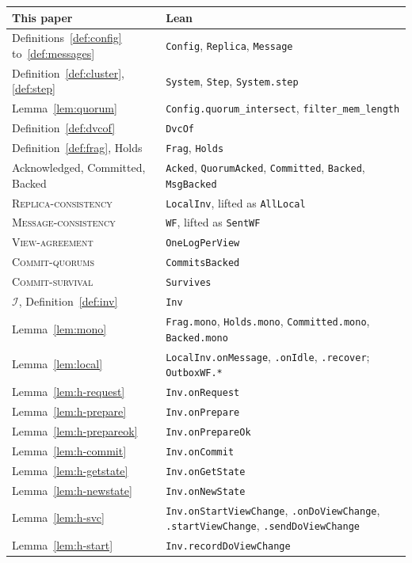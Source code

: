 \documentclass[11pt,a4paper]{article}
\theoremstyle{plain}
\theoremstyle{definition}
\theoremstyle{remark}
\newcommand{\Inv}{\mathcal{I}}
\newcommand{\Local}{\textsc{Replica-consistency}}
\newcommand{\WellFormed}{\textsc{Message-consistency}}
\newcommand{\OneLog}{\textsc{View-agreement}}
\newcommand{\CommitsBacked}{\textsc{Commit-quorums}}
\newcommand{\Survival}{\textsc{Commit-survival}}
\begin{document}
\begin{center}
\small
\begin{tabular}{@{}lp{9.2cm}@{}}
\toprule
This paper & Lean \\
\midrule
Definitions~\ref{def:config} to~\ref{def:messages} & \texttt{Config}, \texttt{Replica}, \texttt{Message} \\
Definition~\ref{def:cluster}, \ref{def:step} & \texttt{System}, \texttt{Step}, \texttt{System.step} \\
Lemma~\ref{lem:quorum} & \texttt{Config.quorum\_intersect}, \texttt{filter\_mem\_length} \\
Definition~\ref{def:dvcof} & \texttt{DvcOf} \\
Definition~\ref{def:frag}, Holds & \texttt{Frag}, \texttt{Holds} \\
Acknowledged, Committed, Backed & \texttt{Acked}, \texttt{QuorumAcked}, \texttt{Committed}, \texttt{Backed}, \texttt{MsgBacked} \\
\Local & \texttt{LocalInv}, lifted as \texttt{AllLocal} \\
\WellFormed & \texttt{WF}, lifted as \texttt{SentWF} \\
\OneLog & \texttt{OneLogPerView} \\
\CommitsBacked & \texttt{CommitsBacked} \\
\Survival & \texttt{Survives} \\
$\Inv$, Definition~\ref{def:inv} & \texttt{Inv} \\
Lemma~\ref{lem:mono} & \texttt{Frag.mono}, \texttt{Holds.mono}, \texttt{Committed.mono}, \texttt{Backed.mono} \\
Lemma~\ref{lem:local} & \texttt{LocalInv.onMessage}, \texttt{.onIdle}, \texttt{.recover}; \texttt{OutboxWF.*} \\
Lemma~\ref{lem:h-request} & \texttt{Inv.onRequest} \\
Lemma~\ref{lem:h-prepare} & \texttt{Inv.onPrepare} \\
Lemma~\ref{lem:h-prepareok} & \texttt{Inv.onPrepareOk} \\
Lemma~\ref{lem:h-commit} & \texttt{Inv.onCommit} \\
Lemma~\ref{lem:h-getstate} & \texttt{Inv.onGetState} \\
Lemma~\ref{lem:h-newstate} & \texttt{Inv.onNewState} \\
Lemma~\ref{lem:h-svc} & \texttt{Inv.onStartViewChange}, \texttt{.onDoViewChange}, \texttt{.startViewChange}, \texttt{.sendDoViewChange} \\
Lemma~\ref{lem:h-start} & \texttt{Inv.recordDoViewChange} \\

\end{tabular}
\end{center}
\end{document}
